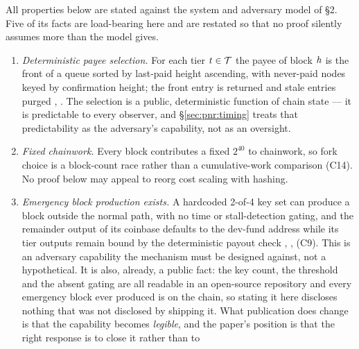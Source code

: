 \begin{assumption}
\label{as:pnr}
All properties below are stated against the system and adversary model of \S2. Five of its facts are
load-bearing here and are restated so that no proof silently assumes more than the model gives.
\begin{enumerate}
  \item[\textbf{A1}] \emph{Deterministic payee selection.} For each tier $t \in \mathcal{T}$ the payee of
    block $h$ is the front of a queue sorted by last-paid height ascending, with never-paid nodes
    keyed by confirmation height; the front entry is returned and stale entries purged \shipped
    ,
    . The selection is a public, deterministic
    function of chain state --- it is predictable to every observer, and \S\ref{sec:pnr:timing}
    treats that predictability as the adversary's capability, not as an oversight.
  \item[\textbf{A2}] \emph{Fixed chainwork.} Every \PoN block contributes a fixed $2^{40}$ to
    chainwork, so fork choice is a block-count race rather than a cumulative-work comparison
    \shipped {} (C14). No proof below may appeal to reorg cost
    scaling with hashing.
  \item[\textbf{A3}] \emph{Emergency block production exists.} A hardcoded 2-of-4 key set can
    produce a block outside the normal \PoN path, with no time or stall-detection gating, and the
    remainder output of its coinbase defaults to the dev-fund address while its tier outputs remain
    bound by the deterministic payout check \shipped
    ,
    ,
     (C9). This is an adversary capability the
    mechanism must be designed against, not a hypothetical. It is also, already, a public fact: the
    key count, the threshold and the absent gating are all readable in an open-source repository and
    every emergency block ever produced is on the chain, so stating it here discloses nothing that was
    not disclosed by shipping it. What publication does change is that the capability becomes
    \emph{legible}, and the paper's position is that the right response is to close it rather than to

\end{enumerate}
\end{assumption}
